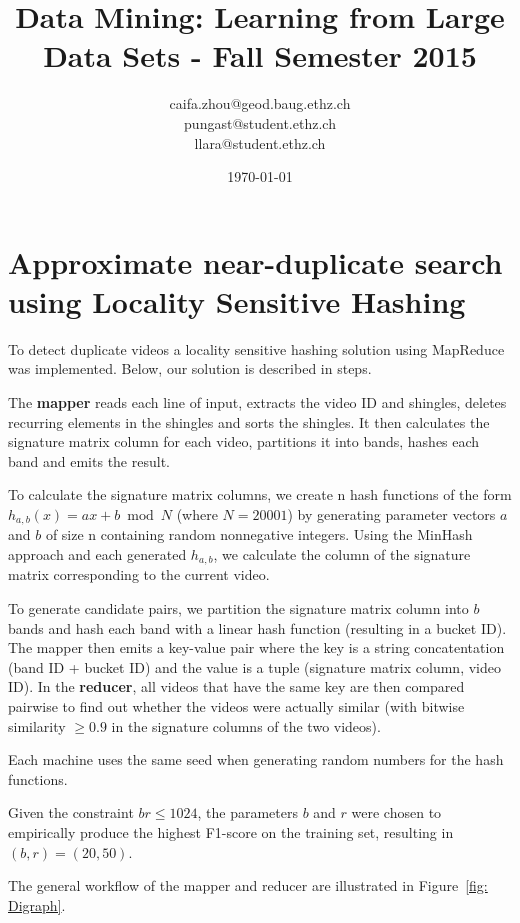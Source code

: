\documentclass[a4paper, 11pt]{article}
\title{Data Mining: Learning from Large Data Sets - Fall Semester 2015}
\author{caifa.zhou@geod.baug.ethz.ch\\ pungast@student.ethz.ch\\ llara@student.ethz.ch\\}
\date{\today}
\begin{document}
\maketitle

\section*{Approximate near-duplicate search using Locality Sensitive Hashing} 

To detect duplicate videos a locality sensitive hashing solution using MapReduce was implemented.
Below, our solution is described in steps.

The \textbf{mapper} reads each line of input, extracts the video ID and shingles, deletes recurring elements in the shingles and sorts the shingles. It then calculates the signature matrix column for each video, partitions it into bands, hashes each band and emits the result.

To calculate the signature matrix columns, we create n hash functions of the form $h_{a,b}(x) = ax + b \bmod N$ (where $N=20001$) by generating parameter vectors $a$ and $b$ of size n containing random nonnegative integers. Using the MinHash approach and each generated $h_{a,b}$, we calculate the column of the signature matrix corresponding to the current video.

To generate candidate pairs, we partition the signature matrix column into $b$ bands and hash each band with a linear hash function (resulting in a bucket ID). The mapper then emits a key-value pair where the key is a string concatentation (band ID + bucket ID) and the value is a tuple (signature matrix column, video ID). In the \textbf{reducer}, all videos that have the same key are then compared pairwise to find out whether the videos were actually similar (with bitwise similarity $\geq 0.9$ in the signature columns of the two videos).

Each machine uses the same seed when generating random numbers for the hash functions.

Given the constraint $ br \leq 1024 $, the parameters $b$ and $r$ were chosen to empirically produce the highest F1-score on the training set, resulting in $(b, r)=(20, 50)$.

The general workflow of the mapper and reducer are illustrated in Figure~\ref{fig: Digraph}. 
\end{document}
